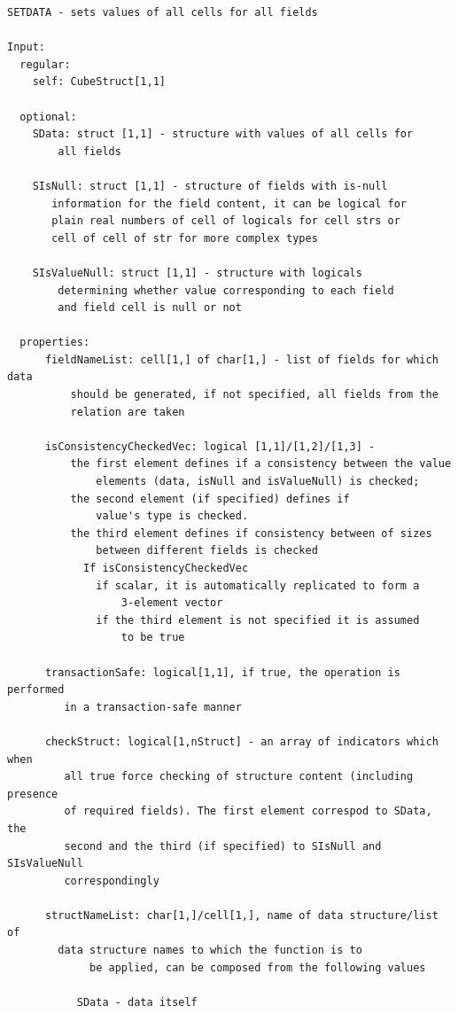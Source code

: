 \documentclass[letterpaper,10pt,english]{sphinxmanual}
\begin{document}
\begin{Verbatim}[commandchars=\\\{\}]
SETDATA - sets values of all cells for all fields

Input:
  regular:
    self: CubeStruct[1,1]

  optional:
    SData: struct [1,1] - structure with values of all cells for
        all fields

    SIsNull: struct [1,1] - structure of fields with is-null
       information for the field content, it can be logical for
       plain real numbers of cell of logicals for cell strs or
       cell of cell of str for more complex types

    SIsValueNull: struct [1,1] - structure with logicals
        determining whether value corresponding to each field
        and field cell is null or not

  properties:
      fieldNameList: cell[1,] of char[1,] - list of fields for which data
          should be generated, if not specified, all fields from the
          relation are taken

      isConsistencyCheckedVec: logical [1,1]/[1,2]/[1,3] -
          the first element defines if a consistency between the value
              elements (data, isNull and isValueNull) is checked;
          the second element (if specified) defines if
              value's type is checked.
          the third element defines if consistency between of sizes
              between different fields is checked
            If isConsistencyCheckedVec
              if scalar, it is automatically replicated to form a
                  3-element vector
              if the third element is not specified it is assumed
                  to be true

      transactionSafe: logical[1,1], if true, the operation is performed
         in a transaction-safe manner

      checkStruct: logical[1,nStruct] - an array of indicators which when
         all true force checking of structure content (including presence
         of required fields). The first element correspod to SData, the
         second and the third (if specified) to SIsNull and SIsValueNull
         correspondingly

      structNameList: char[1,]/cell[1,], name of data structure/list of
        data structure names to which the function is to
             be applied, can be composed from the following values

           SData - data itself


\end{Verbatim}
\end{document}
